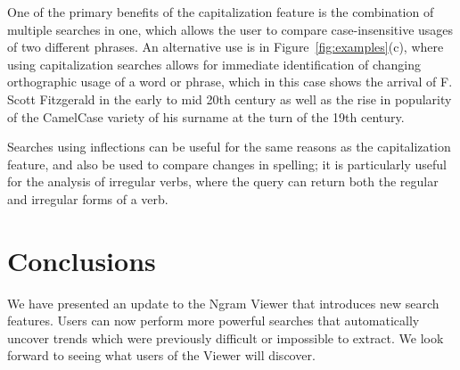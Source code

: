 \documentclass[11pt,a4paper]{article}
\newcommand{\eat}[1]{\ignorespaces}
\begin{document}
One of the primary benefits of the capitalization feature is the combination of multiple searches in one, which allows the user to compare case-insensitive usages of two different phrases. An alternative use is in Figure~\ref{fig:examples}(c), where using capitalization searches allows for immediate identification of changing orthographic usage of a word or phrase, which in this case shows the arrival of F. Scott Fitzgerald in the early to mid 20th century as well as the rise in popularity of the CamelCase variety of his surname at the turn of the 19th century.

Searches using inflections can be useful for the same reasons as the capitalization feature, and also be used to compare changes in spelling; it is particularly useful for the analysis of irregular verbs, where the query can return both the regular and irregular forms of a verb.

\section{Conclusions}
We have presented an update to the Ngram Viewer that introduces new search features. Users can now perform more powerful searches that automatically uncover trends which were previously difficult or impossible to extract. We look forward to seeing what users of the Viewer will discover.

\eat{\section{Acknowledgements}
We would like to thank John DeNero, ...}



\end{document}
